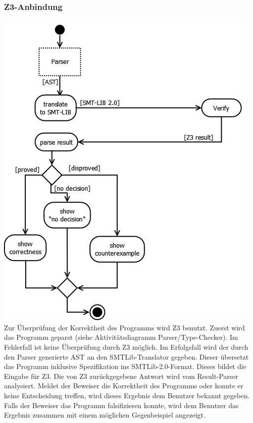 \documentclass[10pt,a4paper,titlepage]{article}
\begin{document}
\subsubsection{Z3-Anbindung}
\includegraphics[scale=0.45]{images/AktivitaetSMTTranslator.png}\newline
Zur Überprüfung der Korrektheit des Programms wird Z3 benutzt. \newline
Zuerst wird das Programm geparst (siehe Aktivitätsdiagramm Parser/Type-Checker). Im Fehlerfall ist keine Überprüfung durch Z3 möglich. Im Erfolgsfall wird der durch den Parser generierte AST an den SMTLib-Translator gegeben. Dieser übersetzt das Programm inklusive Spezifikation ins SMTLib-2.0-Format. Dieses bildet die Eingabe für Z3.\newline
Die von Z3 zurückgegebene Antwort wird vom Result-Parser analysiert. Meldet der Beweiser die Korrektheit des Programms oder konnte er keine Entscheidung treffen, wird dieses Ergebnis dem Benutzer bekannt gegeben. Falls der Beweiser das Programm falsifizieren konnte, wird dem Benutzer das Ergebnis zusammen mit einem möglichen Gegenbeispiel angezeigt.
\end{document}
